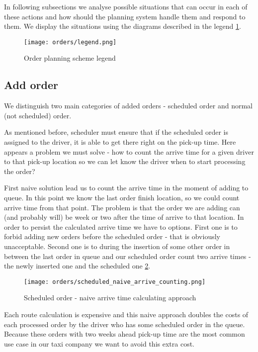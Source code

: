 In following subsections we analyse possible situations that can occur in each of these actions and how should the planning system handle them and respond to them. We display the situations using the diagrams described in the legend \ref{order-planning-legend}.

\begin{figure}[h]\centering
	\texttt{[image: orders/legend.png]}
	\caption{Order planning scheme legend}\label{order-planning-legend}
\end{figure} 



\subsection{Add order}
We distinguish two main categories of added orders - scheduled order and normal (not scheduled) order.

As mentioned before, scheduler must ensure that if the scheduled order is assigned to the driver, it is able to get there right on the pick-up time. Here appears a problem we must solve - how to count the arrive time for a given driver to that pick-up location so we can let know the driver when to start processing the order?

First naive solution lead us to count the arrive time in the moment of adding to queue. In this point we know the last order finish location, so we could count arrive time from that point. The problem is that the order we are adding can (and probably will) be week or two after the time of arrive to that location. In order to persist the calculated arrive time we have to options. First one is to forbid adding new orders before the scheduled order - that is obviously unacceptable. Second one is to during the insertion of some other order in between the last order in queue and our scheduled order count two arrive times - the newly inserted one and the scheduled one \ref{scheduled_naive_arrive_counting}. 

\begin{figure}[h]\centering
	\texttt{[image: orders/scheduled\_naive\_arrive\_counting.png]}
	\caption{Scheduled order - naive arrive time calculating approach} 
	\label{scheduled_naive_arrive_counting}
\end{figure} 

Each route calculation is expensive and this naive approach doubles the costs of each processed order by the driver who has some scheduled order in the queue. Because these orders with two weeks ahead pick-up time are the most common use case in our taxi company we want to avoid this extra cost. 

